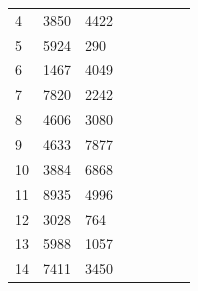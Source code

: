 \begin{table}[tb]
\begin{tabular}{|l|l|l|lllll}
			4                        & 3850                      & 4422                      &                           &                           &                           &                           &                           \\ \cline{1-3}
			5                        & 5924                      & 290                       &                           &                           &                           &                           &                           \\ \cline{1-3}
			6                        & 1467                      & 4049                      &                           &                           &                           &                           &                           \\ \cline{1-3}
			7                        & 7820                      & 2242                      &                           &                           &                           &                           &                           \\ \cline{1-3}
			8                        & 4606                      & 3080                      &                           &                           &                           &                           &                           \\ \cline{1-3}
			9                        & 4633                      & 7877                      &                           &                           &                           &                           &                           \\ \cline{1-3}
			10                       & 3884                      & 6868                      &                           &                           &                           &                           &                           \\ \cline{1-3}
			11                       & 8935                      & 4996                      &                           &                           &                           &                           &                           \\ \cline{1-3}
			12                       & 3028                      & 764                       &                           &                           &                           &                           &                           \\ \cline{1-3}
			13                       & 5988                      & 1057                      &                           &                           &                           &                           &                           \\ \cline{1-3}
			14                       & 7411                      & 3450                      &                           &                           &                           &                           &                           \\ \cline{1-3}
		\end{tabular}

	
\end{table}

